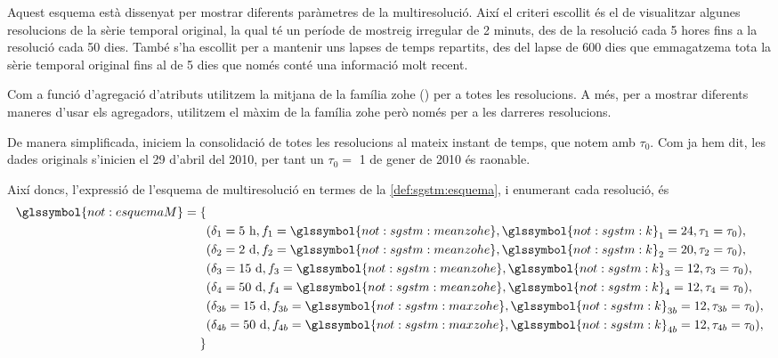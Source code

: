 Aquest esquema està dissenyat per mostrar diferents paràmetres de la
multiresolució. Així el criteri escollit és el de visualitzar algunes
resolucions de la sèrie temporal original, la qual té un període de
mostreig irregular de 2 minuts, des de la resolució cada 5 hores fins
a la resolució cada 50 dies. També s'ha escollit per a mantenir uns
lapses de temps repartits, des del lapse de 600 dies que emmagatzema
tota la sèrie temporal original fins al de 5 dies que només conté una
informació molt recent.


Com a funció d'agregació d'atributs utilitzem la mitjana de la família
\gls{zohe} () per a totes les
resolucions. A més, per a mostrar diferents maneres d'usar els
agregadors, utilitzem el màxim de la família \gls{zohe} però només per
a les darreres resolucions.


De manera simplificada, iniciem la consolidació de totes les
resolucions al mateix instant de temps, que notem amb $\tau_0$. Com ja
hem dit, les dades originals s'inicien el 29 d'abril del 2010, per
tant un $\tau_0=$ 1 de gener de 2010 és raonable.


Així doncs, l'expressió de l'esquema de multiresolució en termes de la \autoref{def:sgstm:esquema}, i enumerant cada resolució,  és
\begin{align*}
\glssymbol{not:esquemaM} = \{ &\\ 
&(\delta_1=5 \text{ h},f_1=\glssymbol{not:sgstm:meanzohe},\glssymbol{not:sgstm:k}_1=24,\tau_1=\tau_0),\\
&(\delta_2=2 \text{ d},f_2=\glssymbol{not:sgstm:meanzohe},\glssymbol{not:sgstm:k}_2=20,\tau_2=\tau_0),\\
&(\delta_3=15 \text{ d},f_3=\glssymbol{not:sgstm:meanzohe},\glssymbol{not:sgstm:k}_3=12,\tau_3=\tau_0),\\
&(\delta_4=50 \text{ d},f_4=\glssymbol{not:sgstm:meanzohe},\glssymbol{not:sgstm:k}_4=12,\tau_4=\tau_0),\\
&(\delta_{3b}=15 \text{ d},f_{3b}=\glssymbol{not:sgstm:maxzohe},\glssymbol{not:sgstm:k}_{3b}=12,\tau_{3b}=\tau_0),\\
&(\delta_{4b}=50 \text{ d},f_{4b}=\glssymbol{not:sgstm:maxzohe},\glssymbol{not:sgstm:k}_{4b}=12,\tau_{4b}=\tau_0),\\
\}&
\end{align*}


